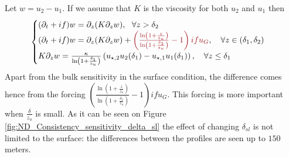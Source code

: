 Let $w=u_2 - u_1$. If we assume that $K$ is the viscosity for both
$u_2$ and $u_1$ then
\begin{equation}
	\begin{cases}
		(\partial_t + if) w = \partial_z (K \partial_z w) ,
		~~ \forall z > \delta_2 \\
(\partial_t + if) w = \partial_z (K \partial_z w)
		+ \emphase{\left(\frac{\ln(1+\frac{z}{z_u})}
		{\ln(1+\frac{\delta_2}{z_u})} - 1\right)i f u_G}
, ~~~\forall z \in (\delta_1, \delta_2) \\
		K \partial_z w = \frac{\kappa}
		{\ln(1+\frac{\delta_1}{z_u})}\left(
		u_{\star, 2} u_2(\delta_1) -
		u_{\star, 1} u_1(\delta_1)\right),
		~~~ \forall z \leq \delta_1
	\end{cases}
\end{equation}
Apart from the bulk sensitivity in the surface condition,
the difference comes hence from the forcing
$\left(\frac{\ln(1+\frac{z}{z_u})}
{\ln(1+\frac{\delta_2}{z_u})} - 1\right)i f u_G$.
This forcing is more important when $\frac{\delta}{z_u}$
is small. As it can be seen on Figure
\ref{fig:ND_Consistency_sensitivity_delta_sl}
the effect of changing $\delta_{sl}$ is not limited to the surface:
the differences between the profiles are seen up
to $150$ meters.
